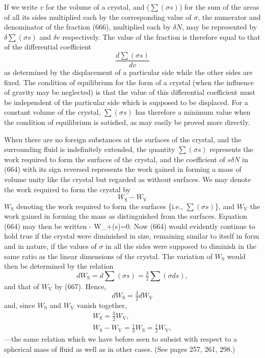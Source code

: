 \documentclass[12pt]{article}
\newcommand{\dd}{\delta}
\begin{document}
If we write $v$ for the volume of a crystal, and ($\sum(\sigma s)$) for the sum of the areas of all its sides multiplied each by the corresponding value of $\sigma$, the numerator and denominator of the fraction (666), multiplied each by $\dd N$, may be represented by $\dd \sum(\sigma s)$ and $\dd v$ respectively. The value of the fraction is therefore equal to that of the differential coefficient 
$$ \frac{d \sum(\sigma s)}{dv} $$
as determined by the displacement of a particular side while the other sides are fixed. The condition of equilibrium for the form of a crystal (when the influence of gravity may be neglected) is that the value of this differential coefficient must be independent of the particular side which is supposed to be displaced. For a constant volume of the crystal, $\sum(\sigma s)$ has therefore a minimum value when the condition of equilibrium is satisfied, as may easily be proved more directly.

When there are no foreign substances at the surfaces of the crystal, and the surrounding fluid is indefinitely extended, the quantity $\sum(\sigma s)$ represents the work required to form the surfaces of the crystal, and the coefficient of $s \dd N$ in (664) with its sign reversed represents the work gained in forming a mass of volume unity like the crystal but regarded as without surfaces. We may denote the work required to form the crystal by 
$$ W_\text{S}-W_\text{V} $$
$W_\text{S}$ denoting the work required to form the surfaces \{i.e., $\sum(\sigma s)$\}, and $W_\text{V}$ the work gained in forming the mass as distinguished from the surfaces. Equation (664) may then be written
\eqs - \dd W_+\sum(\sigma \dd s)=0.  \label{667}\eqe
Now (664) would evidently continue to hold true if the crystal were diminished in size, remaining similar to itself in form and in nature, if the values of $\sigma$ in all the sides were supposed to diminish in the same ratio as the linear dimensions of the crystal. The variation of $W_\text{S}$ would then be determined by the relation
$$dW_\text{S}= d \sum(\sigma s) = \tfrac{3}{2}\sum(\sigma ds),$$
and that of $W_\text{V}$ by (667). Hence,
$$dW_\text{S}= \tfrac{3}{2}d W_\text{V}$$
and, since $W_\text{S}$ and $W_\text{V}$ vanish together,
\begin{align}
W_\text{S}= \tfrac{3}{2} W_\text{V}, \nonumber \\
W_\text{S}- W_\text{V} = \tfrac{1}{3}W_\text{S} = \tfrac{1}{2} W_\text{V},    \label{663}\end{align}
---the same relation which we have before seen to subsist with respect to a spherical mass of fluid as well as in other cases. (See pages 257, 261, 298.)
\end{document}
